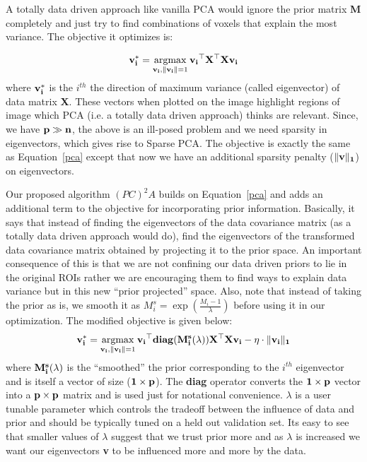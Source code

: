 \documentclass{llncs}
\newcommand{\argmax}{\operatornamewithlimits{argmax}}
\begin{document}
A totally data driven approach like vanilla PCA would ignore the prior matrix {\bf M} completely and just try to find combinations of voxels that explain the most variance. The objective it optimizes is:

\begin{equation}
{\bf v_i^*}= \argmax_{{\bf v_i},{\bf \|v_i\|}=1} {\bf v_i}^{\top}{\bf X^{\top}X}{\bf v_i}
\label{pca}
\end{equation}
where {$\bf v_i^*$} is the $i^{th}$ the direction of maximum variance (called eigenvector) of data matrix {\bf X}. These vectors when plotted on the image highlight regions of image which PCA (i.e. a totally data driven approach) thinks are relevant. Since, we have ${\bf p \gg n}$, the above is an ill-posed problem and we need sparsity in eigenvectors, which gives rise to Sparse PCA. The objective is exactly the same as Equation~\ref{pca} except that now we have an additional sparsity penalty ($\|\bf v \|_1$) on eigenvectors.


Our proposed algorithm $(PC)^2A$ builds on Equation~\ref{pca} and adds an additional term to the objective for incorporating prior information. Basically, it says that instead of finding the eigenvectors of the data covariance matrix (as a totally data driven approach would do), find the eigenvectors of the transformed data covariance matrix obtained by projecting it to the prior space. An important consequence of this is that we are not confining our data driven priors to lie in the original ROIs rather we are encouraging them to find ways to explain data variance but in this new ``prior projected'' space.  Also, note that instead of taking the prior as is, we smooth it as $M^s_i=\exp(\frac{M_i-1}{\lambda})$ before using it in our optimization. The modified objective is given below:
\begin{equation}
\label{ppca}
{\bf v_i^*}= \argmax_{{\bf v_i},{\bf \|v_i\|}=1} {\bf v_i}^{\top}{\bf diag(M^s_i(\lambda))}{\bf X^{\top}X}{\bf v_i} - \eta\cdot\|\bf v_i \|_1
\end{equation}
where ${\bf M^s_i(\lambda)}$ is  the ``smoothed'' the prior corresponding to the $i^{th}$ eigenvector and is itself a vector of size (${\bf 1\times p}$). The {\bf diag} operator converts the ${\bf 1\times p}$ vector into a ${\bf p\times p}$ matrix and is used just for notational convenience.  $\lambda$ is a user tunable parameter which controls the tradeoff between the influence of data and prior and should be typically tuned on a held out validation set. Its easy to see that smaller values of $\lambda$ suggest that we trust prior more and as $\lambda$ is increased we want our eigenvectors {\bf v} to be influenced more and more by the data.
\end{document}
